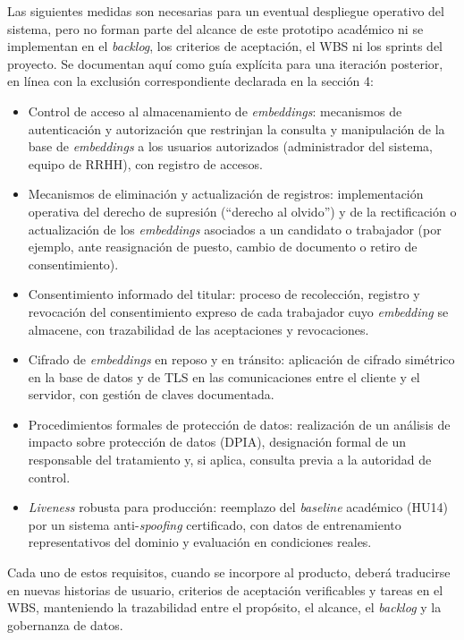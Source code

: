 \documentclass[
  11pt, %
]{charter}
\begin{document}
Las siguientes medidas son necesarias para un eventual despliegue operativo del sistema, pero no forman parte del alcance de este prototipo académico ni se implementan en el \textit{backlog}, los criterios de aceptación, el WBS ni los sprints del proyecto. Se documentan aquí como guía explícita para una iteración posterior, en línea con la exclusión correspondiente declarada en la sección 4:

\begin{itemize}
  \item Control de acceso al almacenamiento de \textit{embeddings}: mecanismos de autenticación y autorización que restrinjan la consulta y manipulación de la base de \textit{embeddings} a los usuarios autorizados (administrador del sistema, equipo de RRHH), con registro de accesos.
  \item Mecanismos de eliminación y actualización de registros: implementación operativa del derecho de supresión (``derecho al olvido'') y de la rectificación o actualización de los \textit{embeddings} asociados a un candidato o trabajador (por ejemplo, ante reasignación de puesto, cambio de documento o retiro de consentimiento).
  \item Consentimiento informado del titular: proceso de recolección, registro y revocación del consentimiento expreso de cada trabajador cuyo \textit{embedding} se almacene, con trazabilidad de las aceptaciones y revocaciones.
  \item Cifrado de \textit{embeddings} en reposo y en tránsito: aplicación de cifrado simétrico en la base de datos y de TLS en las comunicaciones entre el cliente y el servidor, con gestión de claves documentada.
  \item Procedimientos formales de protección de datos: realización de un análisis de impacto sobre protección de datos (DPIA), designación formal de un responsable del tratamiento y, si aplica, consulta previa a la autoridad de control.
  \item \textit{Liveness} robusta para producción: reemplazo del \textit{baseline} académico (HU14) por un sistema anti-\textit{spoofing} certificado, con datos de entrenamiento representativos del dominio y evaluación en condiciones reales.
\end{itemize}

Cada uno de estos requisitos, cuando se incorpore al producto, deberá traducirse en nuevas historias de usuario, criterios de aceptación verificables y tareas en el WBS, manteniendo la trazabilidad entre el propósito, el alcance, el \textit{backlog} y la gobernanza de datos.
\end{document}
